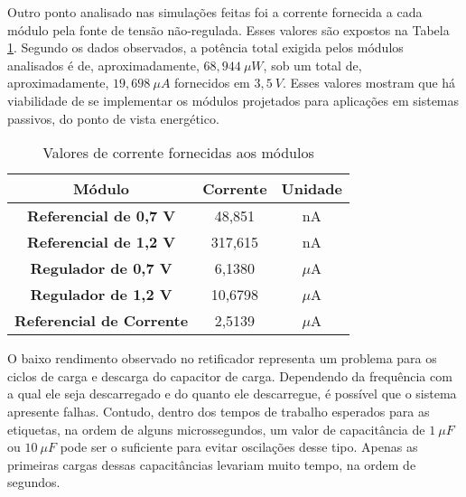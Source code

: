 Outro ponto analisado nas simulações feitas foi a corrente fornecida a cada módulo pela fonte de tensão não-regulada. Esses valores são expostos na Tabela \ref{tab:all_modules_currents}. Segundo os dados observados, a potência total exigida pelos módulos analisados é de, aproximadamente, $68,944~\mu W$, sob um total de, aproximadamente, $19,698~\mu A$ fornecidos em $3,5~V$. Esses valores mostram que há viabilidade de se implementar os módulos projetados para aplicações em sistemas passivos, do ponto de vista energético.

\begin{table}[ht]
	\centering
	\caption{\label{tab:all_modules_currents}Valores de corrente fornecidas aos módulos}
	\begin{tabular}{c|cc}
		\textbf{Módulo} & \textbf{Corrente} & \textbf{Unidade} \\
		\hline
		\textbf{Referencial de 0,7 V} & 48,851 & nA \\
		\textbf{Referencial de 1,2 V} & 317,615 & nA \\
		\textbf{Regulador de 0,7 V} & 6,1380 & $\mu$A \\
		\textbf{Regulador de 1,2 V} & 10,6798 & $\mu$A \\
		\textbf{Referencial de Corrente} & 2,5139 & $\mu$A
	\end{tabular}
\end{table}

O baixo rendimento observado no retificador representa um problema para os ciclos de carga e descarga do capacitor de carga. Dependendo da frequência com a qual ele seja descarregado e do quanto ele descarregue, é possível que o sistema apresente falhas. Contudo, dentro dos tempos de trabalho esperados para as etiquetas, na ordem de alguns microssegundos, um valor de capacitância de $1~\mu F$ ou $10~\mu F$ pode ser o suficiente para evitar oscilações desse tipo. Apenas as primeiras cargas dessas capacitâncias levariam muito tempo, na ordem de segundos.
